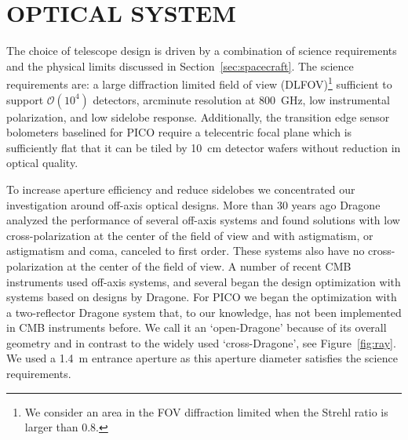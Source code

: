 \documentclass[]{spie}  %
\begin{document}


\section{OPTICAL SYSTEM}
\label{sec:optics}

The choice of telescope design is driven by a combination of science
requirements and the physical limits discussed in Section~\ref{sec:spacecraft}.  The science requirements are: a large diffraction 
limited field of view (DLFOV)\footnote{ We consider an area in the FOV diffraction limited when the Strehl ratio is 
larger than 0.8.} sufficient to support $\mathcal{O}(10^4)$ detectors, arcminute resolution at 800~GHz, low 
instrumental polarization, and low sidelobe response. Additionally, 
the transition edge sensor bolometers baselined for PICO require a telecentric focal plane which is sufficiently flat that it 
can be tiled by 10~cm detector wafers without reduction in optical quality. 

To increase aperture efficiency and reduce sidelobes we concentrated our investigation around off-axis optical designs.
More than 30 years ago Dragone analyzed the 
performance of several off-axis systems and found solutions with low cross-polarization at the center of the field 
of view and with astigmatism, or astigmatism and coma, canceled to first order.\cite{dragone,dragone_coma,dragone1983} These
systems also have no cross-polarization at the center of the field of view. 
A number of recent CMB instruments used off-axis systems, and several 
began the design optimization with systems based on designs by
Dragone\cite{planck2000_optics,ACT2011_optics,SPT2008_optics,core2018_inst,LB2016_optics,parshley_ccat_spie}. 
For PICO we began 
the optimization with a two-reflector Dragone system that, to our knowledge, has not been implemented in CMB instruments before. 
We call it an `open-Dragone' because of its overall geometry and in contrast to the widely used `cross-Dragone', see Figure~\ref{fig:ray}. 
We used a 1.4~m entrance aperture as this aperture diameter satisfies the science requirements.
\end{document}
